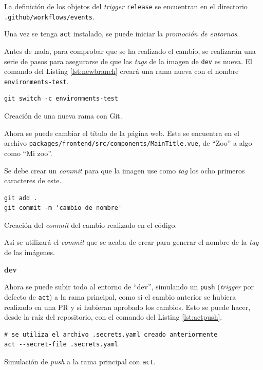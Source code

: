 \begin{enumerate}
    La definición de los objetos del \textit{trigger} \texttt{release} se encuentran en el directorio \texttt{.github/workflows/events}.

    Una vez se tenga \texttt{act} instalado, se puede iniciar la \textit{promoción de entornos}.

    Antes de nada, para comprobar que se ha realizado el cambio, se realizarán una serie de pasos para asegurarse de que las \textit{tags} de la imagen de \texttt{dev} es nueva. El comando del Listing \ref{lst:newbranch} creará una rama nueva con el nombre \texttt{environments-test}.


\begin{listing}[!ht]
  \begin{verbatim}
git switch -c environments-test
  \end{verbatim}
  \caption{Creación de una nueva rama con Git.}
  \label{lst:newbranch}
\end{listing}

    Ahora se puede cambiar el título de la página web. Este se encuentra en el archivo \texttt{packages/frontend/src/components/MainTitle.vue}, de ``Zoo'' a algo como ``Mi zoo''.

    Se debe crear un \textit{commit} para que la imagen use como \textit{tag} los ocho primeros caracteres de este.

\begin{listing}[!ht]
  \begin{verbatim}
git add .
git commit -m 'cambio de nombre'
  \end{verbatim}
  \caption{Creación del \textit{commit} del cambio realizado en el código.}
\end{listing}

    Así se utilizará el \textit{commit} que se acaba de crear para generar el nombre de la \textit{tag} de las imágenes.

    \textbf{dev}

    Ahora se puede subir todo al entorno de ``dev'', simulando un \texttt{push} (\textit{trigger} por defecto de \texttt{act}) a la rama principal, como si el cambio anterior se hubiera realizado en una PR y si hubieran aprobado los cambios. Esto se puede hacer, desde la raíz del repositorio, con el comando del Listing \ref{lst:actpush}.

\begin{listing}[!ht]
  \begin{verbatim}
# se utiliza el archivo .secrets.yaml creado anteriormente
act --secret-file .secrets.yaml
  \end{verbatim}
  \caption{Simulación de \textit{push} a la rama principal con \texttt{act}.}
  \label{lst:actpush}
\end{listing}


\end{enumerate}
